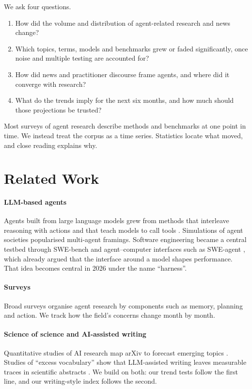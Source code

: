 \documentclass[10.5pt]{article}
\begin{document}
We ask four questions.
\begin{enumerate}[label={\color{violet}\sorasemi RQ\arabic*}, leftmargin=3em, itemsep=3pt]
  \item How did the volume and distribution of agent-related research and news change?
  \item Which topics, terms, models and benchmarks grew or faded significantly, once noise and multiple testing are accounted for?
  \item How did news and practitioner discourse frame agents, and where did it converge with research?
  \item What do the trends imply for the next six months, and how much should those projections be trusted?
\end{enumerate}

Most surveys of agent research describe methods and benchmarks at one point in time. We instead treat the corpus as a time series. Statistics locate what moved, and close reading explains why.

\section{Related Work}

\paragraph{LLM-based agents} Agents built from large language models grew from methods that interleave reasoning with actions \cite{react} and that teach models to call tools \cite{toolformer}. Simulations of agent societies \cite{generativeagents} popularised multi-agent framings. Software engineering became a central testbed through SWE-bench \cite{swebench} and agent--computer interfaces such as SWE-agent \cite{sweagent}, which already argued that the interface around a model shapes performance. That idea becomes central in 2026 under the name \enquote{harness}.

\paragraph{Surveys} Broad surveys \cite{wangsurvey,xisurvey} organise agent research by components such as memory, planning and action. We track how the field's concerns change month by month.

\paragraph{Science of science and AI-assisted writing} Quantitative studies of AI research map arXiv to forecast emerging topics \cite{krenn}. Studies of \enquote{excess vocabulary} show that LLM-assisted writing leaves measurable traces in scientific abstracts \cite{liang2024,kobak2024}. We build on both: our trend tests follow the first line, and our writing-style index follows the second.
\end{document}
